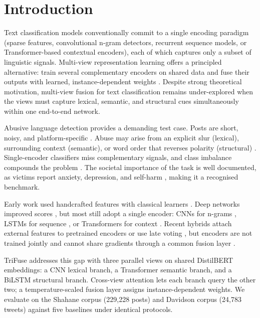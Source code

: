 \documentclass[10pt,twocolumn,a4paper]{article}
\begin{document}
\section{Introduction}\label{sec:intro}

Text classification models conventionally commit to a single encoding paradigm (sparse features, convolutional n-gram detectors, recurrent sequence models, or Transformer-based contextual encoders), each of which captures only a subset of linguistic signals. Multi-view representation learning offers a principled alternative: train several complementary encoders on shared data and fuse their outputs with learned, instance-dependent weights \citep{ref19}. Despite strong theoretical motivation, multi-view fusion for text classification remains under-explored when the views must capture lexical, semantic, and structural cues simultaneously within one end-to-end network.

Abusive language detection provides a demanding test case. Posts are short, noisy, and platform-specific \citep{ref12}. Abuse may arise from an explicit slur (lexical), surrounding context (semantic), or word order that reverses polarity (structural) \citep{ref2,ref4,ref37}. Single-encoder classifiers miss complementary signals, and class imbalance compounds the problem \citep{ref23}. The societal importance of the task is well documented, as victims report anxiety, depression, and self-harm \citep{ref1,ref39,ref42}, making it a recognised benchmark.

Early work used handcrafted features with classical learners \citep{ref2,ref5,ref6,ref18}. Deep networks improved scores \citep{ref3}, but most still adopt a single encoder: CNNs for n-grams \citep{ref7}, LSTMs for sequence \citep{ref8}, or Transformers for context \citep{ref9,ref32,ref34}. Recent hybrids attach external features to pretrained encoders or use late voting \citep{ref14,ref15,ref16,ref33}, but encoders are not trained jointly and cannot share gradients through a common fusion layer \citep{ref19}.

TriFuse addresses this gap with three parallel views on shared DistilBERT embeddings: a CNN lexical branch, a Transformer semantic branch, and a BiLSTM structural branch. Cross-view attention lets each branch query the other two; a temperature-scaled fusion layer assigns instance-dependent weights. We evaluate on the Shahane corpus (229,228 posts) \citep{ref10} and Davidson corpus (24,783 tweets) \citep{ref11} against five baselines under identical protocols.
\end{document}
